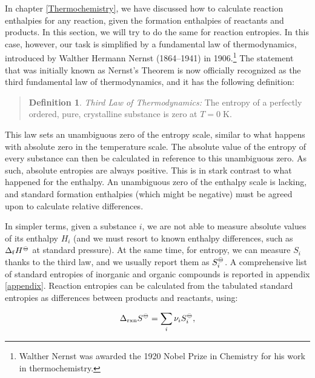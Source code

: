 \documentclass[
  9pt,
]{extbook}
\theoremstyle{definition}
\newtheorem{definition}{Definition}[chapter]
\theoremstyle{definition}
\theoremstyle{definition}
\theoremstyle{remark}
\begin{document}
In chapter \ref{Thermochemistry}, we have discussed how to calculate reaction enthalpies for any reaction, given the formation enthalpies of reactants and products. In this section, we will try to do the same for reaction entropies. In this case, however, our task is simplified by a fundamental law of thermodynamics, introduced by Walther Hermann Nernst (1864--1941) in 1906.\footnote{Walther Nernst was awarded the 1920 Nobel Prize in Chemistry for his work in thermochemistry.} The statement that was initially known as Nernst's Theorem is now officially recognized as the third fundamental law of thermodynamics, and it has the following definition:

\begin{quote}
\begin{definition}
\protect\hypertarget{def:thirdlawdef}{}{\label{def:thirdlawdef} }\emph{Third Law of Thermodynamics:} The entropy of a perfectly ordered, pure, crystalline substance is zero at \(T=0 \; \text{K}\).
\end{definition}
\end{quote}

This law sets an unambiguous zero of the entropy scale, similar to what happens with absolute zero in the temperature scale. The absolute value of the entropy of every substance can then be calculated in reference to this unambiguous zero. As such, absolute entropies are always positive. This is in stark contrast to what happened for the enthalpy. An unambiguous zero of the enthalpy scale is lacking, and standard formation enthalpies (which might be negative) must be agreed upon to calculate relative differences.

In simpler terms, given a substance \(i\), we are not able to measure absolute values of its enthalpy \(H_i\) (and we must resort to known enthalpy differences, such as \(\Delta_{\mathrm{f}} H^{-\kern-6pt{\ominus}\kern-6pt-}\) at standard pressure). At the same time, for entropy, we can measure \(S_i\) thanks to the third law, and we usually report them as \(S_i^{-\kern-6pt{\ominus}\kern-6pt-}\). A comprehensive list of standard entropies of inorganic and organic compounds is reported in appendix \ref{appendix}. Reaction entropies can be calculated from the tabulated standard entropies as differences between products and reactants, using:

\begin{equation}
\Delta_{\text{rxn}} S^{-\kern-6pt{\ominus}\kern-6pt-}= \sum_i \nu_i S_i^{-\kern-6pt{\ominus}\kern-6pt-},
\label{eq:thirdlaweq}
\end{equation}
\end{document}
